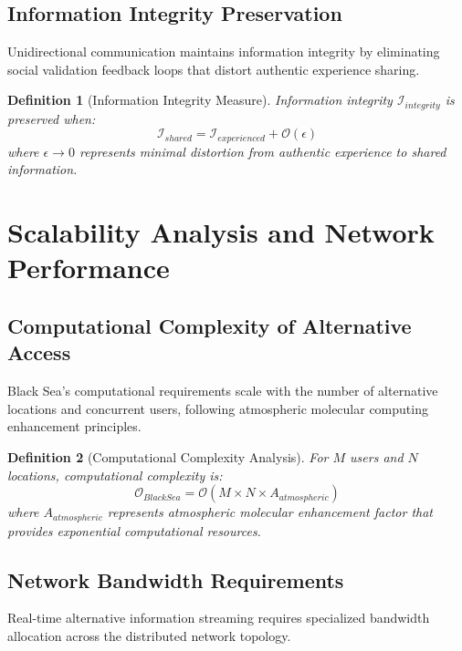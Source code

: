 \documentclass[12pt,a4paper]{article}
\newtheorem{definition}{Definition}
\begin{document}
\subsection{Information Integrity Preservation}

Unidirectional communication maintains information integrity by eliminating social validation feedback loops that distort authentic experience sharing.

\begin{definition}[Information Integrity Measure]
Information integrity $\mathcal{I}_{integrity}$ is preserved when:
\begin{equation}
\mathcal{I}_{shared} = \mathcal{I}_{experienced} + \mathcal{O}(\epsilon)
\end{equation}
where $\epsilon \rightarrow 0$ represents minimal distortion from authentic experience to shared information.
\end{definition}

\section{Scalability Analysis and Network Performance}

\subsection{Computational Complexity of Alternative Access}

Black Sea's computational requirements scale with the number of alternative locations and concurrent users, following atmospheric molecular computing enhancement principles.

\begin{definition}[Computational Complexity Analysis]
For $M$ users and $N$ locations, computational complexity is:
\begin{equation}
\mathcal{O}_{BlackSea} = \mathcal{O}(M \times N \times A_{atmospheric})
\end{equation}
where $A_{atmospheric}$ represents atmospheric molecular enhancement factor that provides exponential computational resources.
\end{definition}

\subsection{Network Bandwidth Requirements}

Real-time alternative information streaming requires specialized bandwidth allocation across the distributed network topology.
\end{document}
